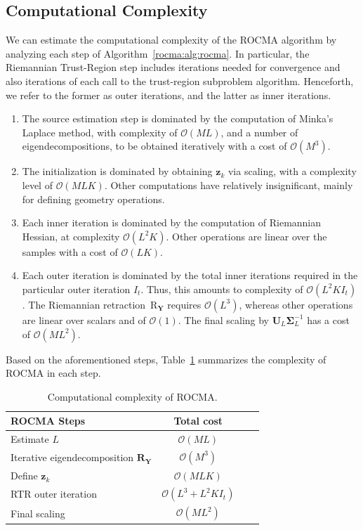 				
					
\subsection{Computational Complexity}
We can estimate the computational complexity of the ROCMA algorithm by analyzing each step of Algorithm~\ref{rocma:alg:rocma}. 
In particular, the Riemannian Trust-Region step includes 
iterations needed for convergence and also 
iterations of each call to the trust-region subproblem
algorithm. Henceforth, we refer to the former as outer iterations, and the latter as inner iterations. 
\begin{enumerate}
	\item The source estimation step is dominated by the computation of Minka's Laplace method, with complexity of $\mathcal{O}(ML)$, and a number of eigendecompositions, to be obtained 
	iteratively with a cost of $\mathcal{O}(M^3)$. 
	\item The initialization is dominated by obtaining $\bm{z}_k$ via scaling, with a complexity level of $\mathcal{O}(MLK)$. Other computations have relatively insignificant, mainly for defining geometry operations.
	\item Each inner iteration is dominated by the computation of	Riemannian Hessian, at complexity $\mathcal{O}(L^2K)$. Other operations are linear over the samples with a cost of $\mathcal{O}(LK)$.
	\item Each outer iteration is dominated by the
	total inner iterations required in the particular outer iteration $I_t$. Thus, this amounts to complexity of  $\mathcal{O}(L^2KI_t)$. The Riemannian retraction~$\mathrm{R}_{\bm{Y}}$ requires
	$\mathcal{O}(L^3)$, whereas other operations are linear over scalars and of $\mathcal{O}(1)$. The final scaling by $\bm{U}_L\bm{\Sigma}_L^{-1}$ has a cost of $\mathcal{O}(ML^2)$.
\end{enumerate}
Based on the aforementioned steps, Table~\ref{rocma:table:complexity_rtr} summarizes the complexity of ROCMA in each step. 
\begin{table}[ht]
	\caption{Computational complexity of ROCMA.}\label{rocma:table:complexity_rtr}
	\centering
	\begin{tabular}{l|ccc}
		ROCMA Steps& Total cost\\\hline
		Estimate $L$& $\mathcal{O}(ML)$  \\
		Iterative eigendecomposition $\bm{R}_{\bm{Y}}$& $\mathcal{O}(M^3)$  \\
		Define $\bm{z}_{k}$& $\mathcal{O}(MLK)$  \\
		RTR outer iteration &  $\mathcal{O}(L^3+L^2KI_t)$  \\
		Final scaling& $\mathcal{O}(ML^2)$  \\
	\end{tabular}
\end{table}

